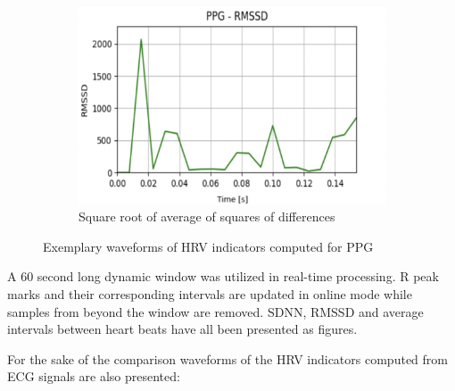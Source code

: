 \documentclass[journal]{IEEEtran}
\begin{document}
\begin{figure}[h]
    \vspace{0.2cm}  
    \begin{subfigure}{0.47\textwidth}
        \centering
        \includegraphics[width=\linewidth]{RMSSD.png}
        \caption{Square root of average of squares of differences}
    \end{subfigure}  
    \caption{Exemplary waveforms of HRV indicators computed for PPG}
\end{figure}

\newpage
A 60 second long dynamic window was utilized in real-time processing. R peak marks and their corresponding intervals are updated in online mode while samples from beyond the window are removed. SDNN, RMSSD and average intervals between heart beats have all been presented as figures.

For the sake of the comparison waveforms of the HRV indicators computed from ECG signals are also presented:
\end{document}
